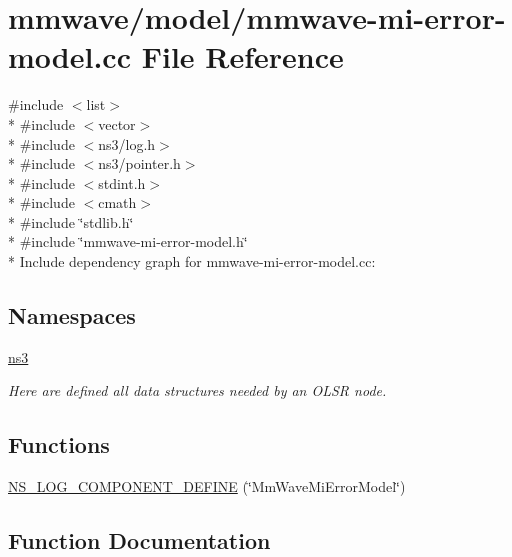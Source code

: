 \hypertarget{mmwave-mi-error-model_8cc}{}\section{mmwave/model/mmwave-\/mi-\/error-\/model.cc File Reference}
\label{mmwave-mi-error-model_8cc}
{\ttfamily \#include $<$list$>$}\\*
{\ttfamily \#include $<$vector$>$}\\*
{\ttfamily \#include $<$ns3/log.\+h$>$}\\*
{\ttfamily \#include $<$ns3/pointer.\+h$>$}\\*
{\ttfamily \#include $<$stdint.\+h$>$}\\*
{\ttfamily \#include $<$cmath$>$}\\*
{\ttfamily \#include \char`\"{}stdlib.\+h\char`\"{}}\\*
{\ttfamily \#include \char`\"{}mmwave-\/mi-\/error-\/model.\+h\char`\"{}}\\*
Include dependency graph for mmwave-\/mi-\/error-\/model.cc\+:
\subsection*{Namespaces}
\begin{DoxyCompactItemize}
\item 
 \hyperlink{namespacens3}{ns3}
\begin{DoxyCompactList}\small\item\em Here are defined all data structures needed by an O\+L\+SR node. \end{DoxyCompactList}\end{DoxyCompactItemize}
\subsection*{Functions}
\begin{DoxyCompactItemize}
\item 
\hyperlink{mmwave-mi-error-model_8cc_a947e663cfec8c8e4ed975b2b132720fc}{N\+S\+\_\+\+L\+O\+G\+\_\+\+C\+O\+M\+P\+O\+N\+E\+N\+T\+\_\+\+D\+E\+F\+I\+NE} (\char`\"{}Mm\+Wave\+Mi\+Error\+Model\char`\"{})
\end{DoxyCompactItemize}


\subsection{Function Documentation}
